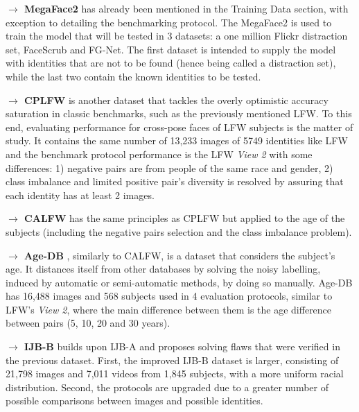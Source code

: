 \documentclass[class=report, crop=false, a4paper, 12pt]{standalone}
\begin{document}
\vspace{0.7\baselineskip}
\noindent\textbf{$\rightarrow$ MegaFace2} \autocite{nechLevelPlayingField2017} has already been mentioned in the Training Data section, with exception to detailing the benchmarking protocol. The MegaFace2 is used to train the model that will be tested in 3 datasets: a one million Flickr distraction set, FaceScrub \autocite{ngDatadrivenApproachCleaning2014} and FG-Net. The first dataset is intended to supply the model with identities that are not to be found (hence being called a distraction set), while the last two contain the known identities to be tested.

\vspace{0.7\baselineskip}
\noindent\textbf{$\rightarrow$ CPLFW} \autocite{zhengCrossPoseLFWDatabase} is another dataset that tackles the overly optimistic accuracy saturation in classic benchmarks, such as the previously mentioned LFW. To this end, evaluating performance for cross-pose faces of LFW subjects is the matter of study. It contains the same number of 13,233 images of 5749 identities like LFW and the benchmark protocol performance is the LFW \textit{View 2} with some differences: 1) negative pairs are from people of the same race and gender, 2) class imbalance and limited positive pair's diversity is resolved by assuring that each identity has at least 2 images.

\vspace{0.7\baselineskip}
\noindent\textbf{$\rightarrow$ CALFW} \autocite{zhengCrossAgeLFWDatabase2017} has the same principles as CPLFW but applied to the age of the subjects (including the negative pairs selection and the class imbalance problem).

\vspace{0.7\baselineskip}
\noindent\textbf{$\rightarrow$ Age-DB} \autocite{moschoglouAgeDBFirstManually2017}, similarly to CALFW, is a dataset that considers the subject's age. It distances itself from other databases by solving the noisy labelling, induced by automatic or semi-automatic methods, by doing so manually. Age-DB has 16,488 images and 568 subjects used in 4 evaluation protocols, similar to LFW's \textit{View 2}, where the main difference between them is the age difference between pairs (5, 10, 20 and 30 years).

\vspace{0.7\baselineskip}
\noindent\textbf{$\rightarrow$ IJB-B} \autocite{whitelamIARPAJanusBenchmarkB2017} builds upon IJB-A and proposes solving flaws that were verified in the previous dataset. First, the improved IJB-B dataset is larger, consisting of 21,798 images and 7,011 videos from 1,845 subjects, with a more uniform racial distribution. Second, the protocols are upgraded due to a greater number of possible comparisons between images and possible identities.
\end{document}
